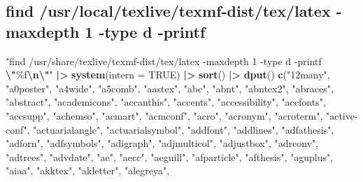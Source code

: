 \documentclass[
]{article}
\newenvironment{Shaded}{\begin{snugshade}}{\end{snugshade}}
\newcommand{\AttributeTok}[1]{\textcolor[rgb]{0.13,0.29,0.53}{#1}}
\newcommand{\ConstantTok}[1]{\textcolor[rgb]{0.56,0.35,0.01}{#1}}
\newcommand{\FunctionTok}[1]{\textcolor[rgb]{0.13,0.29,0.53}{\textbf{#1}}}
\newcommand{\NormalTok}[1]{#1}
\newcommand{\SpecialCharTok}[1]{\textcolor[rgb]{0.81,0.36,0.00}{\textbf{#1}}}
\newcommand{\StringTok}[1]{\textcolor[rgb]{0.31,0.60,0.02}{#1}}
\begin{document}
\hypertarget{find-usrlocaltexlivetexmf-disttexlatex--maxdepth-1--type-d--printf}{%
\subsection{find /usr/local/texlive/texmf-dist/tex/latex -maxdepth 1
-type d
-printf}\label{find-usrlocaltexlivetexmf-disttexlatex--maxdepth-1--type-d--printf}}

\begin{Shaded}
\begin{Highlighting}[]
\StringTok{"find /usr/share/texlive/texmf{-}dist/tex/latex {-}maxdepth 1 {-}type d {-}printf }\SpecialCharTok{\textbackslash{}"}\StringTok{\%f}\SpecialCharTok{\textbackslash{}n\textbackslash{}"}\StringTok{"} \SpecialCharTok{|\textgreater{}}
    \FunctionTok{system}\NormalTok{(}\AttributeTok{intern =} \ConstantTok{TRUE}\NormalTok{) }\SpecialCharTok{|\textgreater{}}
    \FunctionTok{sort}\NormalTok{() }\SpecialCharTok{|\textgreater{}}
    \FunctionTok{dput}\NormalTok{()}
\FunctionTok{c}\NormalTok{(}\StringTok{"12many"}\NormalTok{, }\StringTok{"a0poster"}\NormalTok{, }\StringTok{"a4wide"}\NormalTok{, }\StringTok{"a5comb"}\NormalTok{, }\StringTok{"aastex"}\NormalTok{, }\StringTok{"abc"}\NormalTok{, }
\StringTok{"abnt"}\NormalTok{, }\StringTok{"abntex2"}\NormalTok{, }\StringTok{"abraces"}\NormalTok{, }\StringTok{"abstract"}\NormalTok{, }\StringTok{"academicons"}\NormalTok{, }\StringTok{"accanthis"}\NormalTok{, }
\StringTok{"accents"}\NormalTok{, }\StringTok{"accessibility"}\NormalTok{, }\StringTok{"accfonts"}\NormalTok{, }\StringTok{"accsupp"}\NormalTok{, }\StringTok{"achemso"}\NormalTok{, }
\StringTok{"acmart"}\NormalTok{, }\StringTok{"acmconf"}\NormalTok{, }\StringTok{"acro"}\NormalTok{, }\StringTok{"acronym"}\NormalTok{, }\StringTok{"acroterm"}\NormalTok{, }\StringTok{"active{-}conf"}\NormalTok{, }
\StringTok{"actuarialangle"}\NormalTok{, }\StringTok{"actuarialsymbol"}\NormalTok{, }\StringTok{"addfont"}\NormalTok{, }\StringTok{"addlines"}\NormalTok{, }\StringTok{"adfathesis"}\NormalTok{, }
\StringTok{"adforn"}\NormalTok{, }\StringTok{"adfsymbols"}\NormalTok{, }\StringTok{"adigraph"}\NormalTok{, }\StringTok{"adjmulticol"}\NormalTok{, }\StringTok{"adjustbox"}\NormalTok{, }
\StringTok{"adrconv"}\NormalTok{, }\StringTok{"adtrees"}\NormalTok{, }\StringTok{"advdate"}\NormalTok{, }\StringTok{"ae"}\NormalTok{, }\StringTok{"aecc"}\NormalTok{, }\StringTok{"aeguill"}\NormalTok{, }\StringTok{"afparticle"}\NormalTok{, }
\StringTok{"afthesis"}\NormalTok{, }\StringTok{"aguplus"}\NormalTok{, }\StringTok{"aiaa"}\NormalTok{, }\StringTok{"akktex"}\NormalTok{, }\StringTok{"akletter"}\NormalTok{, }\StringTok{"alegreya"}\NormalTok{, }

\end{Highlighting}
\end{Shaded}
\end{document}
